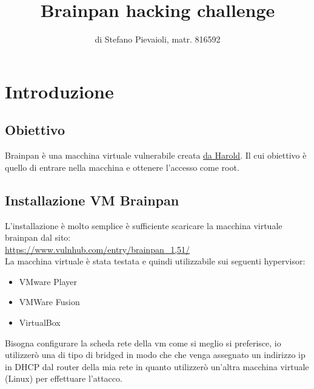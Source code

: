 \documentclass[12pt,letterpaper]{article} %
\title{Brainpan hacking challenge}
\author{di Stefano Pievaioli, matr. 816592}
\begin{document}
 \begin{titlepage}
 \maketitle
 \thispagestyle{empty}
 \end{titlepage}

\tableofcontents
\thispagestyle{empty}
\newpage


\section{Introduzione}
\subsection{Obiettivo}
Brainpan è una macchina virtuale vulnerabile creata  \href{https://blog.techorganic.com/about/}{\underline {da Harold}}. Il cui obiettivo è quello di entrare nella macchina e ottenere l'accesso come root.

\subsection{Installazione VM Brainpan}
L'installazione è molto semplice è sufficiente scaricare la macchina virtuale brainpan dal sito: \\

\url{https://www.vulnhub.com/entry/brainpan_1,51/}\\

\noindent La macchina virtuale è stata testata e quindi utilizzabile sui seguenti hypervisor: 

\begin{itemize}
\item VMware Player
\item VMWare Fusion
\item VirtualBox

\end{itemize}

\noindent  Bisogna configurare la scheda rete della vm come si meglio si preferisce, io utilizzerò una di tipo di bridged in modo che che venga assegnato un indirizzo ip in DHCP dal router della mia rete in quanto utilizzerò un'altra macchina virtuale (Linux) per effettuare l'attacco.
\end{document}
